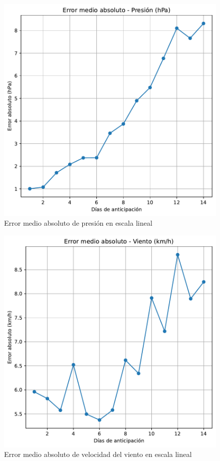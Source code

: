 \documentclass[
  10pt,
  a4paper,
  DIV=11,
  numbers=noendperiod,
  open=any]{scrreprt}
\numberwithin{equation}{chapter}
\numberwithin{equation}{section}
\renewcommand{\[}{\begin{equation}}
\renewcommand{\]}{\end{equation}}
\begin{document}
\begin{figure}[h]
  \centering
  \includegraphics[width=0.99\textwidth]{03-meteorologia/predicciones_files/figure-pdf/cell-3-output-3.pdf}
  \caption{Error medio absoluto de presión en escala lineal}
\end{figure}

\begin{figure}[h]
  \centering
  \includegraphics[width=0.99\textwidth]{03-meteorologia/predicciones_files/figure-pdf/cell-3-output-4.pdf}
  \caption{Error medio absoluto de velocidad del viento en escala lineal}
\end{figure}
\end{document}

